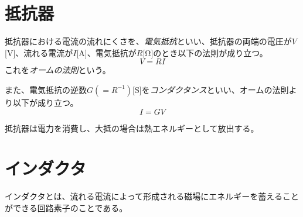\documentclass{ltjsreport}
\begin{document}
\section{抵抗器}

抵抗器における電流の流れにくさを、\emph{電気抵抗}といい、抵抗器の両端の電圧が$V$[\si{\V}]、流れる電流が$I$[\si{\A}]、電気抵抗が$R$[\si{\ohm}]のとき以下の法則が成り立つ。
\begin{equation}
    V = RI
\end{equation}
これを\emph{オームの法則}という。

また、電気抵抗の逆数$G (= R^{-1})$[\si{\siemens}]を\emph{コンダクタンス}といい、オームの法則より以下が成り立つ。
\begin{equation}
    I = GV
\end{equation}

抵抗器は電力を消費し、大抵の場合は熱エネルギーとして放出する。

\section{インダクタ}

インダクタとは、流れる電流によって形成される磁場にエネルギーを蓄えることができる回路素子のことである。
\end{document}
